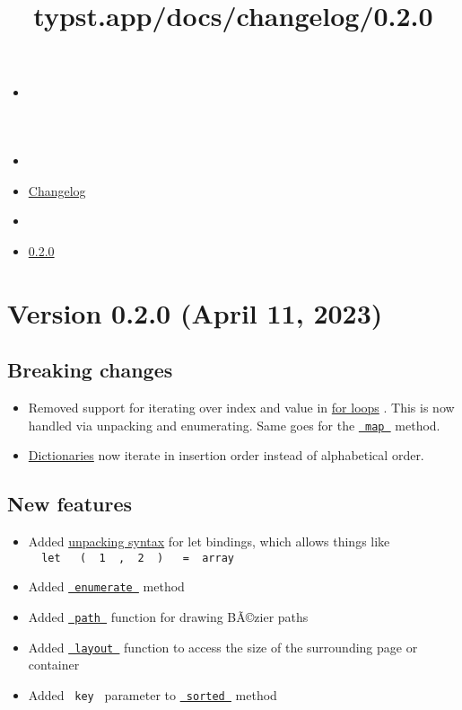 \title{typst.app/docs/changelog/0.2.0}

\begin{itemize}
\tightlist
\item
  \href{/docs}{}
\item
  
\item
  \href{/docs/changelog/}{Changelog}
\item
  
\item
  \href{/docs/changelog/0.2.0/}{0.2.0}
\end{itemize}

\section{Version 0.2.0 (April 11,
2023)}\label{version-0.2.0-april-11-2023}

\subsection{Breaking changes}\label{breaking-changes}

\begin{itemize}
\tightlist
\item
  Removed support for iterating over index and value in
  \href{/docs/reference/scripting/\#loops}{for loops} . This is now
  handled via unpacking and enumerating. Same goes for the
  \href{/docs/reference/foundations/array/\#definitions-map}{\texttt{\ map\ }}
  method.
\item
  \href{/docs/reference/foundations/dictionary/}{Dictionaries} now
  iterate in insertion order instead of alphabetical order.
\end{itemize}

\subsection{New features}\label{new-features}

\begin{itemize}
\tightlist
\item
  Added \href{/docs/reference/scripting/\#bindings}{unpacking syntax}
  for let bindings, which allows things like
  \texttt{\ }{\texttt{\ let\ }}\texttt{\ }{\texttt{\ (\ }}\texttt{\ 1\ }{\texttt{\ ,\ }}\texttt{\ 2\ }{\texttt{\ )\ }}\texttt{\ }{\texttt{\ =\ }}\texttt{\ array\ }
\item
  Added
  \href{/docs/reference/foundations/array/\#definitions-enumerate}{\texttt{\ enumerate\ }}
  method
\item
  Added \href{/docs/reference/visualize/path/}{\texttt{\ path\ }}
  function for drawing BÃ©zier paths
\item
  Added \href{/docs/reference/layout/layout/}{\texttt{\ layout\ }}
  function to access the size of the surrounding page or container
\item
  Added \texttt{\ key\ } parameter to
  \href{/docs/reference/foundations/array/\#definitions-sorted}{\texttt{\ sorted\ }}
  method
\end{itemize}

